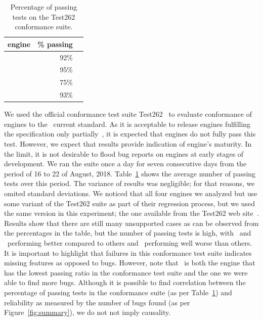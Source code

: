 \documentclass[10pt,conference,anonymous]{IEEEtran}
\begin{document}
\begin{table}
  \centering
  \caption{\label{tab:test262}Percentage of passing tests on
    the Test262 conformance suite.}
  \small
  \begin{tabular}{crr}
    \toprule
    engine & \% passing \\
    \midrule
    \jsc{} & 92\%\\
    \veight{} & 95\% \\
    \chakra{} & 75\% \\    
    \smonkey{} & 93\% \\
    \bottomrule
  \end{tabular}
  \normalsize
\end{table}
We used the official conformance test suite
Test262~\cite{ecma262-conformance-suite} to evaluate conformance of
engines to the \js\ current standard. As it is acceptable to release
engines fulfilling the specification only partially~\cite{kangax}, it
is expected that engines do not fully pass this test. However, we
expect that results provide indication of engine's maturity. In the
limit, it is not desirable to flood bug reports on engines at early
stages of development. We ran the suite once a day for seven
consecutive days from the period of 16 to 22 of August,
2018. Table~\ref{tab:test262} shows the average number of passing
tests over this period. The variance of results was negligible; for
that reasons, we omited standard deviations. We noticed that all four
engines we analyzed but \chakra{} use some variant of the Test262
suite as part of their regression process, but we used the same
version in this experiment; the one available from the Test262 web
site~\cite{ecma262-conformance-suite}. Results show that there are
still many unsupported cases as can be observed from the percentages
in the table, but the number of passing tests is high, with
\veight\ and \smonkey\ performing better compared to others and
\chakra\ performing well worse than others. It is important to
highlight that failures in this conformance test suite indicates
missing features as opposed to bugs. However, note that \chakra\ is
both the engine that has the lowest passing ratio in the conformance
test suite and the one we were able to find more bugs. Although it is
possible to find correlation between the percentage of passing tests
in the conformance suite (as per Table~\ref{tab:test262}) and reliability as
measured by the number of bugs found (as per
Figure~\ref{fig:summary}), we do not not imply causality.
\end{document}
